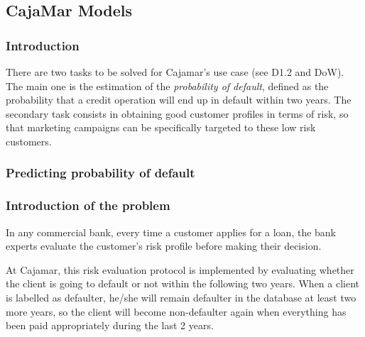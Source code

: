 
\newpage
\newpage
\newcommand{\X}{\mathbf{X}}
\newcommand{\Y}{\mathbf{Y}}
\newcommand{\Z}{\mathbf{Z}}

\subsection{CajaMar Models}
\label{Section:CajaMarModels}

\subsubsection{Introduction}

There are two tasks to be solved for Cajamar's use case (see D1.2 and DoW). The main one is
the estimation of the \emph{probability of default}, defined as the probability that a
credit operation will end up in default within two years. The secondary task consists in obtaining 
good customer profiles in terms of risk, so that marketing campaigns can be
specifically targeted to these low risk customers. 

\subsubsection{Predicting probability of default}
\label{SubSection:Predicting}

\subsubsection*{Introduction of the problem} 

In any commercial bank, every time a customer applies for a loan, the bank experts evaluate the customer's risk profile before making their decision. 

At Cajamar, this risk evaluation protocol is implemented by evaluating whether the client is going to default or not within the following two years. When a client is labelled as defaulter, he/she will remain defaulter in the database at least two more years, so the client will become non-defaulter again when everything has been paid appropriately during the last 2 years. 


